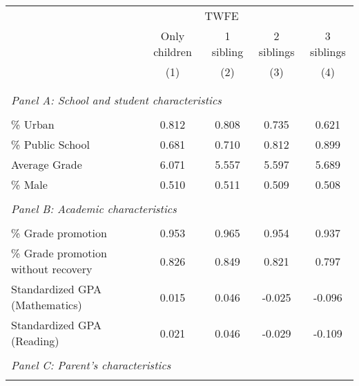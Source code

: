 \makeatletter
{}
{
\makeatother
\begin{tabular}{lcccc}
\toprule
\cmidrule(lr){2-4}
& \multicolumn{3}{c}{TWFE}  \\
\cmidrule(lr){2-4}
& Only children & 1 sibling & 2 siblings & 3 siblings  \\
\cmidrule(lr){2-2} \cmidrule(lr){3-3} \cmidrule(lr){4-4} \cmidrule(lr){5-5}
& (1) & (2) & (3) & (4)\\
\bottomrule
&  &  &  & \\
&  &  &   \\
\multicolumn{4}{l}{\textit{Panel A: School and student characteristics}} \\
            &            &            &            &            \\
\midrule
\% Urban    &       0.812&       0.808&       0.735&       0.621\\
\% Public School&       0.681&       0.710&       0.812&       0.899\\
Average Grade&       6.071&       5.557&       5.597&       5.689\\
\% Male     &       0.510&       0.511&       0.509&       0.508\\
&  &  &   \\
\multicolumn{4}{l}{\textit{Panel B: Academic characteristics}} \\
            &            &            &            &            \\
\midrule
\% Grade promotion&       0.953&       0.965&       0.954&       0.937\\
\% Grade promotion without recovery&       0.826&       0.849&       0.821&       0.797\\
Standardized GPA (Mathematics) &       0.015&       0.046&      -0.025&      -0.096\\
Standardized GPA (Reading)&       0.021&       0.046&      -0.029&      -0.109\\
&  &  &   \\
\multicolumn{4}{l}{\textit{Panel C: Parent's characteristics}} \\
            &            &            &            &            \\
\midrule

\end{tabular}}
